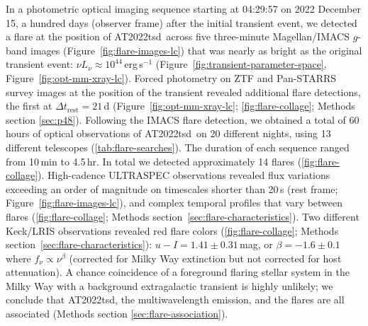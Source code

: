 \documentclass{nature_plusfigure}
\newcommand{\at}{AT2022tsd}
\begin{document}
In a photometric optical imaging sequence starting at 04:29:57 on 2022 December 15, a hundred days (observer frame) after the initial transient event, we detected\cite{Ho2022_Astronote_Flares} a flare at the position of \at\ across five three-minute Magellan/IMACS $g$-band images (Figure~\ref{fig:flare-images-lc}) that was nearly as bright as the original transient event: $\nu L_\nu \approx 10^{44}\,$erg\,s$^{-1}$ (Figure~\ref{fig:transient-parameter-space}, Figure~\ref{fig:opt-mm-xray-lc}).
Forced photometry on ZTF and Pan-STARRS survey\cite{Tonry2012,Chambers2016} images at the position of the transient revealed additional flare detections, the first at $\Delta t_\mathrm{rest}=21$\,d (Figure~\ref{fig:opt-mm-xray-lc}; \ref{fig:flare-collage}; Methods section \ref{sec:p48}).
Following the IMACS flare detection, we obtained a total of 60 hours of optical observations of \at\ on 20 different nights, using 13 different telescopes (\ref{tab:flare-searches}). The duration of each sequence ranged from 10\,min to 4.5\,hr. In total we detected approximately 14 flares (\ref{fig:flare-collage}). High-cadence ULTRASPEC\cite{Dhillon2014} observations revealed flux variations exceeding an order of magnitude on timescales shorter than 20\,s (rest frame; Figure~\ref{fig:flare-images-lc}), and complex temporal profiles that vary between flares (\ref{fig:flare-collage}; Methods section~\ref{sec:flare-characteristics}).
Two different Keck/LRIS observations revealed red flare colors (\ref{fig:flare-collage}; Methods section~\ref{sec:flare-characteristics}):
$u-I=1.41\pm0.31\,$mag, or $\beta=-1.6\pm0.1$ where
$f_\nu \propto \nu^{\beta}$ (corrected for Milky Way extinction but not corrected for host attenuation).
A chance coincidence of a foreground flaring stellar system in the Milky Way with a background extragalactic transient is highly unlikely; we conclude that \at, the multiwavelength emission, and the flares are all associated (Methods section \ref{sec:flare-association}).
\end{document}
